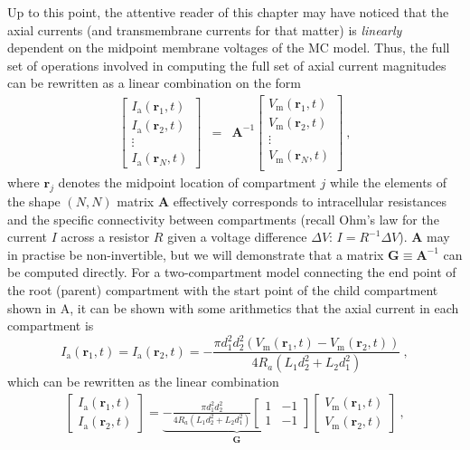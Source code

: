 Up to this point, the attentive reader of this chapter may have noticed that the axial currents (and transmembrane currents for that matter) is \textit{linearly} dependent on the midpoint membrane voltages of the MC model.
Thus, the full set of operations involved in computing the full set of axial current magnitudes can be rewritten as a linear combination on the form
%
\begin{eqnarray}
\begin{bmatrix}
I_\text{a}(\mathbf{r}_1, t)\\
I_\text{a}(\mathbf{r}_2, t)\\
\vdots \\
I_\text{a}(\mathbf{r}_N, t)
\end{bmatrix}
&=& \mathbf{A}^{-1}
\begin{bmatrix}
V_\text{m}(\mathbf{r}_1, t)\\
V_\text{m}(\mathbf{r}_2, t)\\
\vdots \\
V_\text{m}(\mathbf{r}_N, t)\\
\end{bmatrix} ~,
\label{eq:LFPy_linear_combination}
\end{eqnarray}
%
where $\mathbf{r}_j$ denotes the midpoint location of compartment $j$ while the elements of the shape $(N, N)$ matrix $\mathbf{A}$ effectively corresponds to intracellular resistances and the specific connectivity between compartments
(recall Ohm's law for the current $I$ across a resistor $R$ given a voltage difference $\Delta V$: $I=R^{-1} \Delta V$).
$\mathbf{A}$ may in practise be non-invertible,
but we will demonstrate that a matrix $\mathbf{G}\equiv \mathbf{A}^{-1}$ can be computed directly.
%
For a two-compartment model connecting the end point of the root (parent) compartment with the start point of the child compartment shown in A,
it can be shown with some arithmetics that the axial current in each compartment is 
%
\begin{equation}
I_\text{a}(\mathbf{r}_1, t) = I_\text{a}(\mathbf{r}_2, t) =
	- \frac{\pi d_{1}^{2} d_{2}^{2} \left(V_\text{m}(\mathbf{r}_1, t) - V_\text{m}(\mathbf{r}_2, t) \right)}{4 R_{a} \left(L_{1} d_{2}^{2} + L_{2} d_{1}^{2}\right)} ~,
\end{equation}
%
which can be rewritten as the linear combination
%
\begin{eqnarray}
\begin{bmatrix}
I_\text{a}(\mathbf{r}_1, t)\\
I_\text{a}(\mathbf{r}_2, t)
\end{bmatrix}
= \underbrace{
- \frac{\pi d_{1}^{2} d_{2}^{2}}{4 R_{a} \left(L_{1} d_{2}^{2} + L_{2} d_{1}^{2}\right)}
\begin{bmatrix}
1 & -1 \\
1 & -1
\end{bmatrix}
}_{\mathbf{G}}
\begin{bmatrix}
V_\text{m}(\mathbf{r}_1, t) \\
V_\text{m}(\mathbf{r}_2, t)
\end{bmatrix} ~,
\end{eqnarray}
